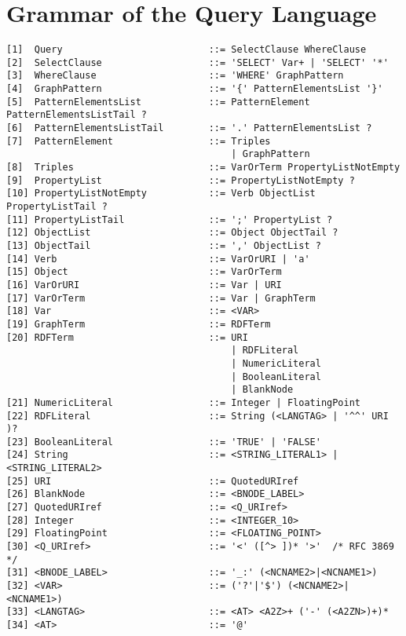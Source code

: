 \documentclass[11pt,a4paper,headsepline, bibtotoc]{scrreprt}
\begin{document}
\chapter{Grammar of the Query Language} \label{grammar}
\begin{verbatim}
[1]  Query                          ::= SelectClause WhereClause
[2]  SelectClause                   ::= 'SELECT' Var+ | 'SELECT' '*'
[3]  WhereClause                    ::= 'WHERE' GraphPattern
[4]  GraphPattern                   ::= '{' PatternElementsList '}'
[5]  PatternElementsList            ::= PatternElement PatternElementsListTail ?
[6]  PatternElementsListTail        ::= '.' PatternElementsList ?
[7]  PatternElement                 ::= Triples
                                        | GraphPattern
[8]  Triples                        ::= VarOrTerm PropertyListNotEmpty
[9]  PropertyList                   ::= PropertyListNotEmpty ?
[10] PropertyListNotEmpty           ::= Verb ObjectList PropertyListTail ?
[11] PropertyListTail               ::= ';' PropertyList ?
[12] ObjectList                     ::= Object ObjectTail ?
[13] ObjectTail                     ::= ',' ObjectList ?
[14] Verb                           ::= VarOrURI | 'a'
[15] Object                         ::= VarOrTerm
[16] VarOrURI                       ::= Var | URI
[17] VarOrTerm                      ::= Var | GraphTerm
[18] Var                            ::= <VAR>
[19] GraphTerm                      ::= RDFTerm
[20] RDFTerm                        ::= URI 
                                        | RDFLiteral 
                                        | NumericLiteral
                                        | BooleanLiteral
                                        | BlankNode
[21] NumericLiteral                 ::= Integer | FloatingPoint
[22] RDFLiteral                     ::= String (<LANGTAG> | '^^' URI )?
[23] BooleanLiteral                 ::= 'TRUE' | 'FALSE'
[24] String                         ::= <STRING_LITERAL1> | <STRING_LITERAL2>
[25] URI                            ::= QuotedURIref
[26] BlankNode                      ::= <BNODE_LABEL>
[27] QuotedURIref                   ::= <Q_URIref>
[28] Integer                        ::= <INTEGER_10>
[29] FloatingPoint                  ::= <FLOATING_POINT>
[30] <Q_URIref>                     ::= '<' ([^> ])* '>'  /* RFC 3869 */
[31] <BNODE_LABEL>                  ::= '_:' (<NCNAME2>|<NCNAME1>)
[32] <VAR>                          ::= ('?'|'$') (<NCNAME2>|<NCNAME1>)
[33] <LANGTAG>                      ::= <AT> <A2Z>+ ('-' (<A2ZN>)+)*
[34] <AT>                           ::= '@'

\end{verbatim}
\end{document}
